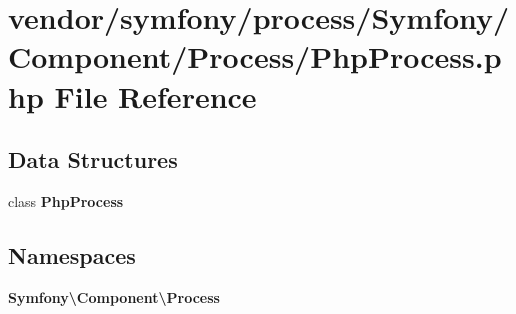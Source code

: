 \section{vendor/symfony/process/\+Symfony/\+Component/\+Process/\+Php\+Process.php File Reference}
\label{_php_process_8php}
\subsection*{Data Structures}
\begin{DoxyCompactItemize}
\item 
class {\bf Php\+Process}
\end{DoxyCompactItemize}
\subsection*{Namespaces}
\begin{DoxyCompactItemize}
\item 
 {\bf Symfony\textbackslash{}\+Component\textbackslash{}\+Process}
\end{DoxyCompactItemize}
